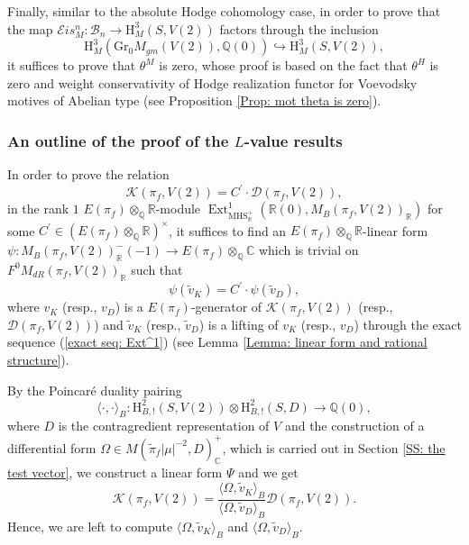 \documentclass[11pt, a4paper]{amsart}
\theoremstyle{plain}
\theoremstyle{definition}
\numberwithin{equation}{section}
\def\CC{\mathbb{C}}
\def\QQ{\mathbb{Q}}
\def\RR{\mathbb{R}}
\DeclareMathOperator{\Ext}{Ext}
\begin{document}
\par Finally, similar to the absolute Hodge cohomology case, in order to prove that the map $\mathcal{E}is_{M}^n\colon \mathcal{B}_{n} \rightarrow \mathrm{H}^{3}_{M}(S, V(2))$ factors through the inclusion 
\[
     \mathrm{H}_{M}^{3}(\mathrm{Gr_{0}}M_{gm}(V(2)), \QQ(0)) \hookrightarrow \mathrm{H}^{3}_{M}(S, V(2)), 
\] 
it suffices to prove that $\theta^{M}$ is zero, whose proof is based on the fact that $\theta^{H}$ is zero and weight conservativity of Hodge realization functor for Voevodsky motives of Abelian type \cite[Theorem 1.12.]{Wild_15} (see Proposition \ref{Prop: mot theta is zero}). 

\subsubsection{An outline of the proof of the $L$-value results}

In order to prove the relation 
\begin{equation*}
    \mathcal{K}(\pi_f, V(2)) = C^{\prime} \cdot \mathcal{D}(\pi_f, V(2)), 
\end{equation*}
in the rank $1$ $E(\pi_f) \otimes_{\QQ} \RR$-module $\Ext^{1}_{\mathrm{MHS_{\RR}^{+}}}(\RR(0), M_{B}(\pi_f, V(2))_{\RR})$ for some $C^{\prime} \in (E(\pi_f) \otimes_{\QQ} \RR)^{\times}$, it suffices to find an $E(\pi_f) \otimes_{\QQ} \RR$-linear form $\psi \colon M_{B}(\pi_f, V(2))^{-}_{\RR}(-1) \rightarrow E(\pi_f) \otimes_{\QQ} \CC$ which is trivial on $F^{0}M_{dR}(\pi_f, V(2))_{\RR}$ such that 
\begin{equation*}
    \psi(\tilde{v}_{K}) = C^{\prime} \cdot \psi(\tilde{v}_{D}), 
\end{equation*}
where $v_{K}$ (resp., $v_{D}$) is a $E(\pi_f)$-generator of $\mathcal{K}(\pi_f, V(2))$ (resp., $\mathcal{D}(\pi_f, V(2))$) and $\tilde{v}_{K}$ (resp., $\tilde{v}_{D}$) is a lifting of $v_{K}$ (resp., $v_{D}$) through the exact sequence (\ref{exact seq: Ext^1}) (see Lemma \ref{Lemma: linear form and rational structure}).

\par By the Poincar\'{e} duality pairing 
\begin{equation*}
        \langle \cdot, \cdot \rangle_{B} \colon \mathrm{H}^{2}_{B, !}(S, V(2)) \otimes \mathrm{H}^{2}_{B, !}(S, D) \rightarrow \QQ(0),
\end{equation*}
where $D$ is the contragredient representation of $V$ and the construction of a differential form $\Omega \in M(\tilde{\pi}_f|\mu|^{-2}, D)_{\CC}^{+}$, which is carried out in Section \ref{SS: the test vector}, we construct a linear form $\Psi$ and we get 
\begin{equation*}
    \mathcal{K}(\pi_{f}, V(2)) = \frac{\langle \Omega, \tilde{v}_{K} \rangle_{B}}{\langle \Omega, \tilde{v}_{D} \rangle_{B}} \mathcal{D}(\pi_f, V(2)). 
\end{equation*}
Hence, we are left to compute $\langle \Omega, \tilde{v}_{K} \rangle_{B}$ and $\langle \Omega, \tilde{v}_{D} \rangle_{B}$.  
\end{document}
